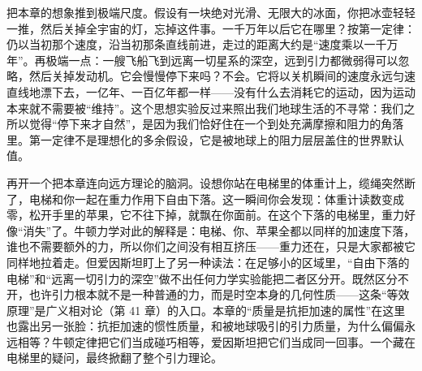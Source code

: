 
\begin{thought}[无限冰面与宇宙尽头的冰壶]
把本章的想象推到极端尺度。假设有一块绝对光滑、无限大的冰面，你把冰壶轻轻一推，然后关掉全宇宙的灯，忘掉这件事。一千万年以后它在哪里？按第一定律：仍以当初那个速度，沿当初那条直线前进，走过的距离大约是“速度乘以一千万年”。再极端一点：一艘飞船飞到远离一切星系的深空，远到引力都微弱得可以忽略，然后关掉发动机。它会慢慢停下来吗？不会。它将以关机瞬间的速度永远匀速直线地漂下去，一亿年、一百亿年都一样——没有什么去消耗它的运动，因为运动本来就不需要被“维持”。这个思想实验反过来照出我们地球生活的不寻常：我们之所以觉得“停下来才自然”，是因为我们恰好住在一个到处充满摩擦和阻力的角落里。第一定律不是理想化的多余假设，它是被地球上的阻力层层盖住的世界默认值。
\end{thought}

\begin{thought}
再开一个把本章连向远方理论的脑洞。设想你站在电梯里的体重计上，缆绳突然断了，电梯和你一起在重力作用下自由下落。这一瞬间你会发现：体重计读数变成零，松开手里的苹果，它不往下掉，就飘在你面前。在这个下落的电梯里，重力好像“消失”了。牛顿力学对此的解释是：电梯、你、苹果全都以同样的加速度下落，谁也不需要额外的力，所以你们之间没有相互挤压——重力还在，只是大家都被它同样地拉着走。但爱因斯坦盯上了另一种读法：在足够小的区域里，“自由下落的电梯”和“远离一切引力的深空”做不出任何力学实验能把二者区分开。既然区分不开，也许引力根本就不是一种普通的力，而是时空本身的几何性质——这条“等效原理”是广义相对论（第 41 章）的入口。本章的“质量是抗拒加速的属性”在这里也露出另一张脸：抗拒加速的惯性质量，和被地球吸引的引力质量，为什么偏偏永远相等？牛顿定律把它们当成碰巧相等，爱因斯坦把它们当成同一回事。一个藏在电梯里的疑问，最终掀翻了整个引力理论。
\end{thought}

